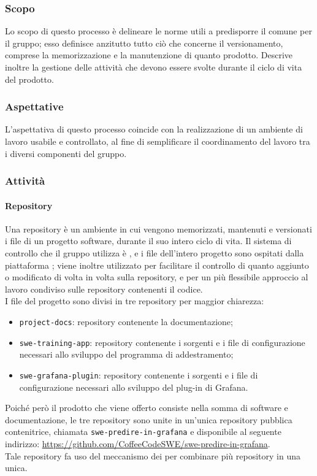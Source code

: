 \documentclass[../norme-di-progetto.tex]{subfiles}
\begin{document}
\subsubsection{Scopo}
Lo scopo di questo processo è delineare le norme utili a predisporre il  comune per il gruppo; esso definisce anzitutto tutto ciò che concerne il versionamento, comprese la memorizzazione e la manutenzione di quanto prodotto. Descrive inoltre la gestione delle attività che devono essere svolte durante il ciclo di vita del prodotto.

\subsubsection{Aspettative}
L'aspettativa di questo processo coincide con la realizzazione di un ambiente di lavoro usabile e controllato, al fine di semplificare il coordinamento del lavoro tra i diversi componenti del gruppo.

\subsubsection{Attività}
\paragraph{Repository}
Una repository è un ambiente in cui vengono memorizzati, mantenuti e versionati i file di un progetto software, durante il suo intero ciclo di vita. Il sistema di controllo che il gruppo utilizza è , e i file dell'intero progetto sono ospitati dalla piattaforma ; viene inoltre utilizzato  per facilitare il controllo di quanto aggiunto o modificato di volta in volta sulla repository, e  per un più flessibile approccio al lavoro condiviso sulle repository contenenti il codice. \\
I file del progetto sono divisi in tre repository per maggior chiarezza:
\begin{itemize}
  \item \texttt{project-docs}: repository contenente la documentazione;
  \item \texttt{swe-training-app}: repository contenente i sorgenti e i file di configurazione necessari allo sviluppo del programma di addestramento;
  \item \texttt{swe-grafana-plugin}: repository contenente i sorgenti e i file di configurazione necessari allo sviluppo del plug-in di Grafana.
\end{itemize}
Poiché però il prodotto che viene offerto consiste nella somma di software e documentazione, le tre repository sono unite in un'unica repository pubblica contenitrice, chiamata \texttt{swe-predire-in-grafana} e disponibile al seguente indirizzo: \href{https://github.com/CoffeeCodeSWE/swe-predire-in-grafana}{https://github.com/CoffeeCodeSWE/swe-predire-in-grafana}. \\
Tale repository fa uso del meccanismo dei  per combinare più repository in una unica.
\end{document}
